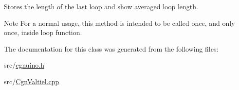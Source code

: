 Stores the length of the last loop and show averaged loop length. 

\begin{DoxyNote}{Note}
For a normal usage, this method is intended to be called once, and only once, inside {\ttfamily loop} function. 
\end{DoxyNote}


The documentation for this class was generated from the following files\+:\begin{DoxyCompactItemize}
\item 
src/\hyperlink{cgnuino_8h}{cgnuino.\+h}\item 
src/\hyperlink{CgnValtiel_8cpp}{Cgn\+Valtiel.\+cpp}\end{DoxyCompactItemize}
